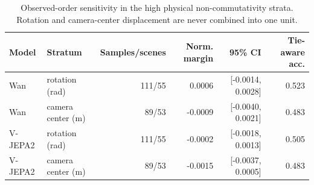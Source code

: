 \begin{table}[t]
\centering
\small
\caption{Observed-order sensitivity in the high physical non-commutativity strata. Rotation and camera-center displacement are never combined into one unit.}
\label{tab:se3_noncomm}
\begin{tabular}{llrrrr}
\toprule
Model & Stratum & Samples/scenes & Norm. margin & 95\% CI & Tie-aware acc. \\
\midrule
Wan & rotation (rad) & 111/55 & 0.0006 & [-0.0014, 0.0028] & 0.523 \\
Wan & camera center (m) & 89/53 & -0.0009 & [-0.0040, 0.0021] & 0.483 \\
V-JEPA2 & rotation (rad) & 111/55 & -0.0002 & [-0.0018, 0.0013] & 0.505 \\
V-JEPA2 & camera center (m) & 89/53 & -0.0015 & [-0.0037, 0.0005] & 0.483 \\
\bottomrule
\end{tabular}
\end{table}
